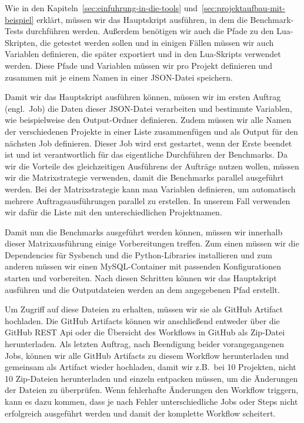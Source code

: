 Wie in den Kapiteln~\ref{sec:einfuhrung-in-die-tools} und~\ref{sec:projektaufbau-mit-beispiel} erklärt, müssen wir das Hauptskript ausführen, in dem die Benchmark-Tests durchführen werden.
Außerdem benötigen wir auch die Pfade zu den Lua-Skripten, die getestet werden sollen und in einigen Fällen müssen wir auch Variablen definieren, die später exportiert und in den Lua-Skripts verwendet werden.
Diese Pfade und Variablen müssen wir pro Projekt definieren und zusammen mit je einem Namen in einer JSON-Datei speichern.

\vspace{-5pt}

\vspace{-5pt}

Damit wir das Hauptskript ausführen können, müssen wir im ersten Auftrag (engl.\ Job) die Daten dieser JSON-Datei verarbeiten und bestimmte Variablen, wie beispielweise den Output-Ordner definieren.
Zudem müssen wir alle Namen der verschiedenen Projekte in einer Liste zusammenfügen und als Output für den nächsten Job definieren.
Dieser Job wird erst gestartet, wenn der Erste beendet ist und ist verantwortlich für das eigentliche Durchführen der Benchmarks.
Da wir die Vorteile des gleichzeitigen Ausführens der Aufträge nutzen wollen, müssen wir die Matrixstrategie verwenden, damit die Benchmarks parallel ausgeführt werden.
Bei der Matrixstrategie kann man Variablen definieren, um automatisch mehrere Auftragsausführungen parallel zu erstellen.
In unserem Fall verwenden wir dafür die Liste mit den unterschiedlichen Projektnamen.

Damit nun die Benchmarks ausgeführt werden können, müssen wir innerhalb dieser Matrixausführung einige Vorbereitungen treffen.
Zum einen müssen wir die Dependencies für Sysbench und die Python-Libraries installieren und zum anderen müssen wir einen MySQL-Container mit passenden Konfigurationen starten und vorbereiten.
Nach diesen Schritten können wir das Hauptskript ausführen und die Outputdateien werden an dem angegebenen Pfad erstellt.

Um Zugriff auf diese Dateien zu erhalten, müssen wir sie als GitHub Artifact hochladen.
Die GitHub Artifacts können wir anschließend entweder über die GitHub REST Api oder die Übersicht des Workflows in GitHub als Zip-Datei herunterladen.
Als letzten Auftrag, nach Beendigung beider vorangegangenen Jobs, können wir alle GitHub Artifacts zu diesem Workflow herunterladen und gemeinsam als Artifact wieder hochladen, damit wir z.B.\ bei 10 Projekten, nicht 10 Zip-Dateien herunterladen und einzeln entpacken müssen, um die Änderungen der Dateien zu überprüfen.
Wenn fehlerhafte Änderungen den Workflow triggern, kann es dazu kommen, dass je nach Fehler unterschiedliche Jobs oder Steps nicht erfolgreich ausgeführt werden und damit der komplette Workflow scheitert.


